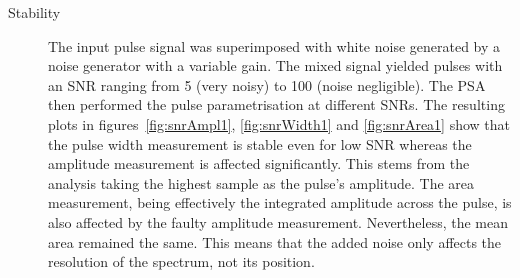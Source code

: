 \documentclass[12pt]{packages/mytustyle}  %
\begin{document}
\begin{description}
\item[Stability]
The input pulse signal was superimposed with white noise generated by a noise generator with a variable gain. The mixed signal yielded pulses with an SNR ranging from 5 (very noisy) to 100 (noise negligible). The PSA then performed the pulse parametrisation at different SNRs. The resulting plots in figures~\ref{fig:snrAmpl1}, \ref{fig:snrWidth1} and \ref{fig:snrArea1} show that the pulse width measurement is stable even for low SNR whereas the amplitude measurement is affected significantly. This stems from the analysis taking the highest sample as the pulse's amplitude. The area measurement, being effectively the integrated amplitude across the pulse, is also affected by the faulty amplitude measurement. Nevertheless, the mean area remained the same. This means that the added noise only affects the resolution of the spectrum, not its position.
 \end{description}
\end{document}

